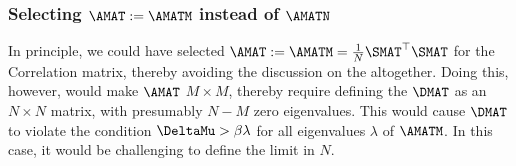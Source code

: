 \subsubsection{Selecting \texorpdfstring{$\AMAT:=\AMATM$}{A:=A M} instead of 
\texorpdfstring{$\AMATN$}{A N}}
\label{sxn:tanaka_end}
In principle, we could have selected $\AMAT:=\AMATM=\tfrac{1}{N}\SMAT^{\top}\SMAT$  for the \Student Correlation matrix,
thereby avoiding the discussion on the \DualityOfMeasures altogether.
Doing this, however, would make $\AMAT$ $M\times M$, thereby
require defining the \SourceMatrix $\DMAT$ as an
$N \times N$ matrix, with presumably $N-M$ zero eigenvalues.
This would cause $\DMAT$ to violate the condition $\DeltaMu > \beta\lambda$
for all eigenvalues $\lambda$ of $\AMATM$.
In this case, it would be challenging to define the \LargeN limit in $N$.
